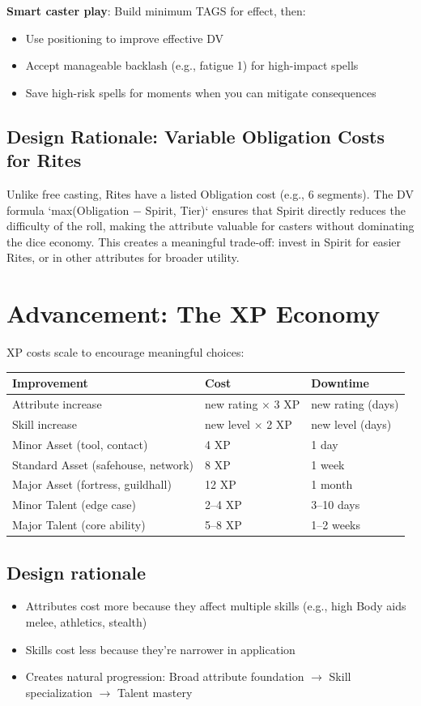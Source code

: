 \documentclass[11pt]{article}
\begin{document}
\textbf{Smart caster play}: Build minimum TAGS for effect, then:
\begin{itemize}
    \item Use positioning to improve effective DV
    \item Accept manageable backlash (e.g., fatigue 1) for high-impact spells
    \item Save high-risk spells for moments when you can mitigate consequences
\end{itemize}

\subsection{Design Rationale: Variable Obligation Costs for Rites}
Unlike free casting, Rites have a listed Obligation cost (e.g., 6 segments). The DV formula `max(Obligation − Spirit, Tier)` ensures that Spirit directly reduces the difficulty of the roll, making the attribute valuable for casters without dominating the dice economy. This creates a meaningful trade-off: invest in Spirit for easier Rites, or in other attributes for broader utility.

\section{Advancement: The XP Economy}

XP costs scale to encourage meaningful choices:

\begin{table}[h]
\centering
\begin{tabular}{lll}
\toprule
\textbf{Improvement} & \textbf{Cost} & \textbf{Downtime} \\
\midrule
Attribute increase & new rating × 3 XP & new rating (days) \\
Skill increase & new level × 2 XP & new level (days) \\
Minor Asset (tool, contact) & 4 XP & 1 day \\
Standard Asset (safehouse, network) & 8 XP & 1 week \\
Major Asset (fortress, guildhall) & 12 XP & 1 month \\
Minor Talent (edge case) & 2--4 XP & 3--10 days \\
Major Talent (core ability) & 5--8 XP & 1--2 weeks \\
\bottomrule
\end{tabular}
\end{table}

\subsection{Design rationale}
\begin{itemize}
    \item Attributes cost more because they affect multiple skills (e.g., high Body aids melee, athletics, stealth)
    \item Skills cost less because they're narrower in application
    \item Creates natural progression: Broad attribute foundation $\rightarrow$ Skill specialization $\rightarrow$ Talent mastery
\end{itemize}
\end{document}
